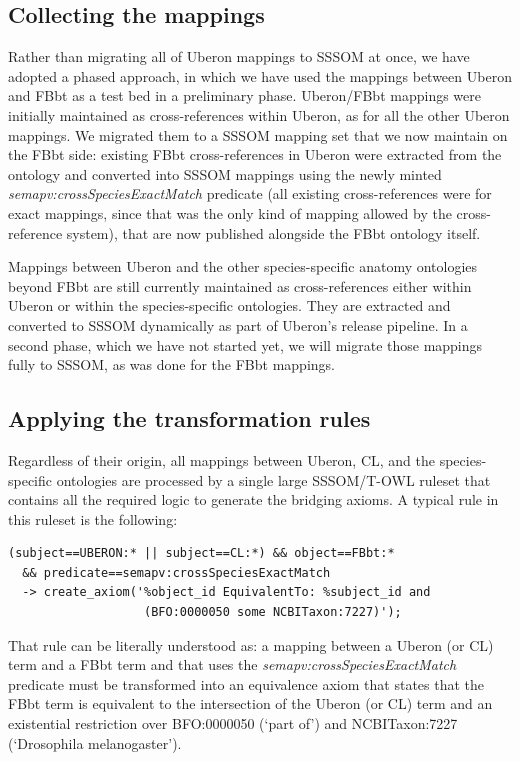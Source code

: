 \documentclass{ceurart}
\def\term#1{`#1'}
\def\property#1{\textit{#1}}
\def\curie#1{\textsf{#1}}
\begin{document}
\subsection{Collecting the mappings}

Rather than migrating all of Uberon mappings to SSSOM at once, we have
adopted a phased approach, in which we have used the mappings between
Uberon and FBbt as a test bed in a preliminary phase. Uberon/FBbt
mappings were initially maintained as cross-references within Uberon, as
for all the other Uberon mappings. We migrated them to a SSSOM mapping
set that we now maintain on the FBbt side: existing FBbt
cross-references in Uberon were extracted from the ontology and
converted into SSSOM mappings using the newly minted
\property{semapv:crossSpeciesExactMatch} predicate (all existing
cross-references were for exact mappings, since that was the only kind
of mapping allowed by the cross-reference system), that are now
published alongside the FBbt ontology itself.

Mappings between Uberon and the other species-specific anatomy
ontologies beyond FBbt are still currently maintained as
cross-references either within Uberon or within the species-specific
ontologies. They are extracted and converted to SSSOM dynamically as
part of Uberon's release pipeline. In a second phase, which we have not
started yet, we will migrate those mappings fully to SSSOM, as was done
for the FBbt mappings.

\subsection{Applying the transformation rules}

Regardless of their origin, all mappings between Uberon, CL, and the
species-specific ontologies are processed by a single large SSSOM/T-OWL
ruleset that contains all the required logic to generate the bridging
axioms. A typical rule in this ruleset is the following:

\begin{lstlisting}
(subject==UBERON:* || subject==CL:*) && object==FBbt:*
  && predicate==semapv:crossSpeciesExactMatch
  -> create_axiom('%object_id EquivalentTo: %subject_id and
                   (BFO:0000050 some NCBITaxon:7227)');
\end{lstlisting}

That rule can be literally understood as: a mapping between a Uberon (or
CL) term and a FBbt term and that uses the
\property{semapv:crossSpeciesExactMatch} predicate must be transformed
into an equivalence axiom that states that the FBbt term is equivalent
to the intersection of the Uberon (or CL) term and an existential
restriction over \curie{BFO:0000050} (\term{part of}) and
\curie{NCBITaxon:7227} (\term{Drosophila melanogaster}).
\end{document}
